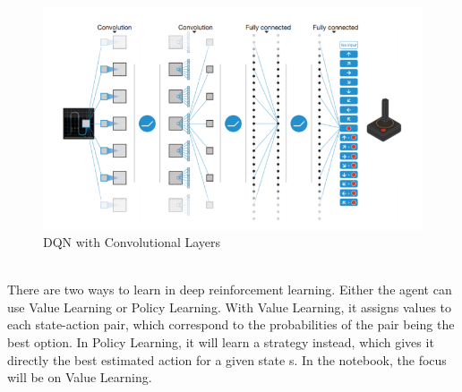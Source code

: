 		\begin{figure}[h!]
			\begin{center}
				\includegraphics[width=0.7\linewidth]{img/v2-67ef75bb7f5e67b2a42645aa821894bf_hd.png}
				\caption{DQN with Convolutional Layers}
				\label{cnndqn}
			\end{center}
		\end{figure}\\
		There are two ways to learn in deep reinforcement learning.
		Either the agent can use Value Learning or Policy Learning.
		With Value Learning, it assigns values to each state-action pair, which correspond to the probabilities of the pair being the best option.
		In Policy Learning, it will learn a strategy instead, which gives it directly the best estimated action for a given state s. 
		In the notebook, the focus will be on Value Learning. 
			

